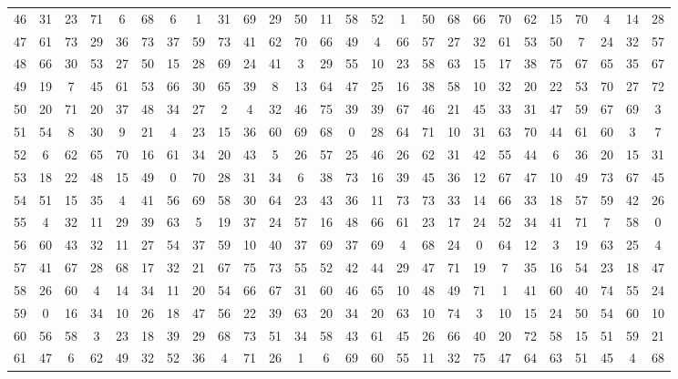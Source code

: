 \begin{table}
\begin{tabular}{c c c c c c c c c c c c c c c c c c c c c c c c c c }
46 & 31 & 23 & 71 & 6 & 68 & 6 & 1 & 31 & 69 & 29 & 50 & 11 & 58 & 52 & 1 & 50 & 68 & 66 & 70 & 62 & 15 & 70 & 4 & 14 & 28 \\
47 & 61 & 73 & 29 & 36 & 73 & 37 & 59 & 73 & 41 & 62 & 70 & 66 & 49 & 4 & 66 & 57 & 27 & 32 & 61 & 53 & 50 & 7 & 24 & 32 & 57 \\
48 & 66 & 30 & 53 & 27 & 50 & 15 & 28 & 69 & 24 & 41 & 3 & 29 & 55 & 10 & 23 & 58 & 63 & 15 & 17 & 38 & 75 & 67 & 65 & 35 & 67 \\
49 & 19 & 7 & 45 & 61 & 53 & 66 & 30 & 65 & 39 & 8 & 13 & 64 & 47 & 25 & 16 & 38 & 58 & 10 & 32 & 20 & 22 & 53 & 70 & 27 & 72 \\
50 & 20 & 71 & 20 & 37 & 48 & 34 & 27 & 2 & 4 & 32 & 46 & 75 & 39 & 39 & 67 & 46 & 21 & 45 & 33 & 31 & 47 & 59 & 67 & 69 & 3 \\
51 & 54 & 8 & 30 & 9 & 21 & 4 & 23 & 15 & 36 & 60 & 69 & 68 & 0 & 28 & 64 & 71 & 10 & 31 & 63 & 70 & 44 & 61 & 60 & 3 & 7 \\
52 & 6 & 62 & 65 & 70 & 16 & 61 & 34 & 20 & 43 & 5 & 26 & 57 & 25 & 46 & 26 & 62 & 31 & 42 & 55 & 44 & 6 & 36 & 20 & 15 & 31 \\
53 & 18 & 22 & 48 & 15 & 49 & 0 & 70 & 28 & 31 & 34 & 6 & 38 & 73 & 16 & 39 & 45 & 36 & 12 & 67 & 47 & 10 & 49 & 73 & 67 & 45 \\
54 & 51 & 15 & 35 & 4 & 41 & 56 & 69 & 58 & 30 & 64 & 23 & 43 & 36 & 11 & 73 & 73 & 33 & 14 & 66 & 33 & 18 & 57 & 59 & 42 & 26 \\
55 & 4 & 32 & 11 & 29 & 39 & 63 & 5 & 19 & 37 & 24 & 57 & 16 & 48 & 66 & 61 & 23 & 17 & 24 & 52 & 34 & 41 & 71 & 7 & 58 & 0 \\
56 & 60 & 43 & 32 & 11 & 27 & 54 & 37 & 59 & 10 & 40 & 37 & 69 & 37 & 69 & 4 & 68 & 24 & 0 & 64 & 12 & 3 & 19 & 63 & 25 & 4 \\
57 & 41 & 67 & 28 & 68 & 17 & 32 & 21 & 67 & 75 & 73 & 55 & 52 & 42 & 44 & 29 & 47 & 71 & 19 & 7 & 35 & 16 & 54 & 23 & 18 & 47 \\
58 & 26 & 60 & 4 & 14 & 34 & 11 & 20 & 54 & 66 & 67 & 31 & 60 & 46 & 65 & 10 & 48 & 49 & 71 & 1 & 41 & 60 & 40 & 74 & 55 & 24 \\
59 & 0 & 16 & 34 & 10 & 26 & 18 & 47 & 56 & 22 & 39 & 63 & 20 & 34 & 20 & 63 & 10 & 74 & 3 & 10 & 15 & 24 & 50 & 54 & 60 & 10 \\
60 & 56 & 58 & 3 & 23 & 18 & 39 & 29 & 68 & 73 & 51 & 34 & 58 & 43 & 61 & 45 & 26 & 66 & 40 & 20 & 72 & 58 & 15 & 51 & 59 & 21 \\
61 & 47 & 6 & 62 & 49 & 32 & 52 & 36 & 4 & 71 & 26 & 1 & 6 & 69 & 60 & 55 & 11 & 32 & 75 & 47 & 64 & 63 & 51 & 45 & 4 & 68 \\

\end{tabular}
\end{table}

